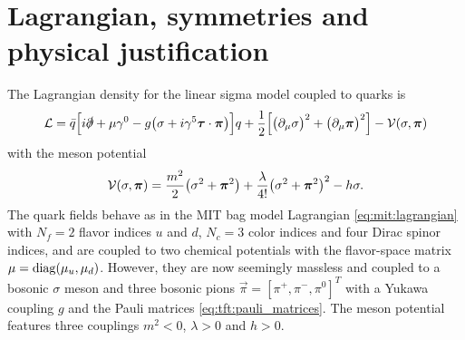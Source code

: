 \section{Lagrangian, symmetries and physical justification}
\label{sec:lsm:vacuum}

The Lagrangian density for the linear sigma model coupled to quarks is \cite{ref:jo_lsm_consistent_physical}
\begin{equation}
	\mathcal{L} = \bar{q} \Big[ i \slashed\partial + \mu \gamma^0 - g \big( \sigma + i \gamma^5 {\bm{\tau}} \cdot {\bm{\pi}} \big) \Big] q
	      + \frac12 \Big[ \big( \partial_\mu \sigma \big)^2 + \big( \partial_\mu {\bm{\pi}} \big)^2 \Big] - \mathcal{V}(\sigma,{\bm{\pi}})
\label{eq:lsm:lagrangian}
\end{equation}
with the meson potential
\begin{equation}
	\mathcal{V}(\sigma, {\bm{\pi}}) = \frac{m^2}{2} \big( \sigma^2 + {\bm{\pi}}^2 \big) + \frac{\lambda}{4!} \big( \sigma^2 + {\bm{\pi}}^2 \big)^2 - h \sigma .
\label{eq:lsm:potential}
\end{equation}
The quark fields behave as in the MIT bag model Lagrangian \eqref{eq:mit:lagrangian} with $N_f=2$ flavor indices $u$ and $d$, $N_c=3$ color indices and four Dirac spinor indices, and are coupled to two chemical potentials with the flavor-space matrix $\mu = \operatorname{diag} (\mu_u, \mu_d)$.
However, they are now seemingly massless and coupled to a bosonic $\sigma$ meson and three bosonic pions $\vec\pi = [\pi^+, \pi^-, \pi^0]^T$ with a Yukawa coupling $g$ and the Pauli matrices \eqref{eq:tft:pauli_matrices}.
The meson potential features three couplings $m^2<0$, $\lambda>0$ and $h>0$.

